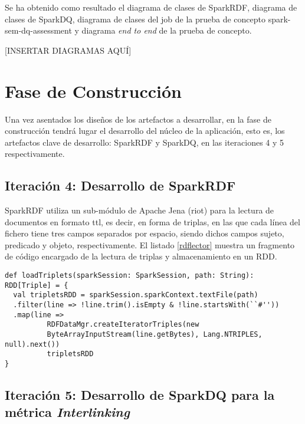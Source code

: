 Se ha obtenido como resultado el diagrama de clases de SparkRDF, diagrama de clases
de SparkDQ, diagrama de clases del job de la prueba de concepto 
spark-sem-dq-assessment y diagrama \textit{end to end} de la prueba de
concepto.

[INSERTAR DIAGRAMAS AQUÍ]


\section{Fase de Construcción}

Una vez asentados los diseños de los artefactos a desarrollar, en la fase de
construcción tendrá lugar el desarrollo del núcleo de la aplicación, esto es,
los artefactos clave de desarrollo: SparkRDF y SparkDQ, en las iteraciones 4 y 5
respectivamente. 

\subsection{Iteración 4: Desarrollo de SparkRDF}



SparkRDF utiliza un sub-módulo de Apache Jena (riot) para la lectura de
documentos en formato ttl, es decir, en forma de triplas, en las que cada línea
del fichero tiene tres campos separados por espacio, siendo dichos campos sujeto,
predicado y objeto, respectivamente. El listado \ref{rdflector} muestra un
fragmento de código encargado de la lectura de triplas y almacenamiento en un
RDD. 

\lstset{escapechar=@,language=scala}
\begin{lstlisting}[caption={Fragmento del lector de triplas},captionpos=b, label=rdflector]
def loadTriplets(sparkSession: SparkSession, path: String): RDD[Triple] = {
  val tripletsRDD = sparkSession.sparkContext.textFile(path)
  .filter(line => !line.trim().isEmpty & !line.startsWith(``#''))
  .map(line =>
          RDFDataMgr.createIteratorTriples(new
          ByteArrayInputStream(line.getBytes), Lang.NTRIPLES, null).next())
          tripletsRDD
}  
\end{lstlisting}



\subsection{Iteración 5: Desarrollo de SparkDQ para la métrica \textit{Interlinking}}



